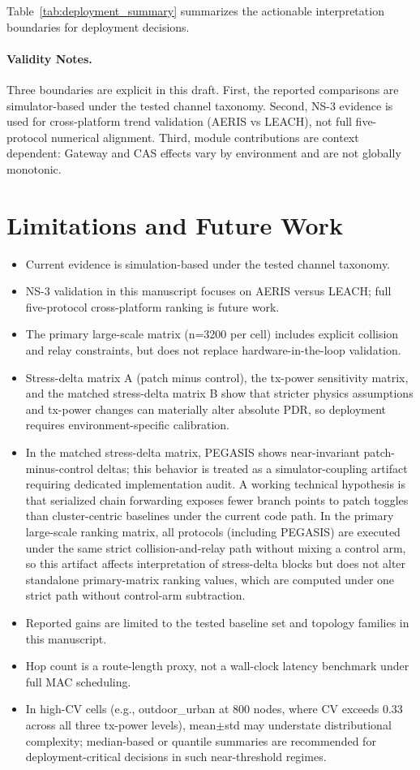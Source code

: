 ﻿\documentclass[sensors,article,submit,moreauthors,pdftex]{Definitions/mdpi}
\begin{document}
Table~\ref{tab:deployment_summary} summarizes the actionable interpretation boundaries for deployment decisions.

\paragraph{Validity Notes.}
Three boundaries are explicit in this draft. First, the reported comparisons are simulator-based under the tested channel taxonomy. Second, NS-3 evidence is used for cross-platform trend validation (AERIS vs LEACH), not full five-protocol numerical alignment. Third, module contributions are context dependent: Gateway and CAS effects vary by environment and are not globally monotonic.

\section{Limitations and Future Work}
\begin{itemize}
\item Current evidence is simulation-based under the tested channel taxonomy.
\item NS-3 validation in this manuscript focuses on AERIS versus LEACH; full five-protocol cross-platform ranking is future work.
\item The primary large-scale matrix (n=3200 per cell) includes explicit collision and relay constraints, but does not replace hardware-in-the-loop validation.
\item Stress-delta matrix A (patch minus control), the tx-power sensitivity matrix, and the matched stress-delta matrix B show that stricter physics assumptions and tx-power changes can materially alter absolute PDR, so deployment requires environment-specific calibration.
\item In the matched stress-delta matrix, PEGASIS shows near-invariant patch-minus-control deltas; this behavior is treated as a simulator-coupling artifact requiring dedicated implementation audit. A working technical hypothesis is that serialized chain forwarding exposes fewer branch points to patch toggles than cluster-centric baselines under the current code path. In the primary large-scale ranking matrix, all protocols (including PEGASIS) are executed under the same strict collision-and-relay path without mixing a control arm, so this artifact affects interpretation of stress-delta blocks but does not alter standalone primary-matrix ranking values, which are computed under one strict path without control-arm subtraction.
\item Reported gains are limited to the tested baseline set and topology families in this manuscript.
\item Hop count is a route-length proxy, not a wall-clock latency benchmark under full MAC scheduling.
\item In high-CV cells (e.g., outdoor\_urban at 800 nodes, where CV exceeds 0.33 across all three tx-power levels), mean$\pm$std may understate distributional complexity; median-based or quantile summaries are recommended for deployment-critical decisions in such near-threshold regimes.
\end{itemize}
\end{document}
